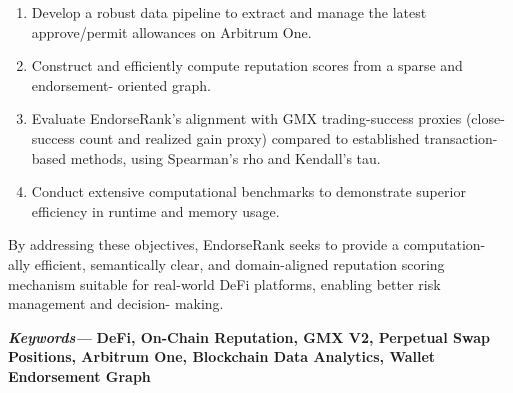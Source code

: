 \begin{enumerate}
\item[1.] Develop a robust data pipeline to extract and manage the latest approve/permit allowances on Arbitrum One.
\item[2.] Construct and efficiently compute reputation scores from a sparse and endorsement- oriented graph.
\item[3.] Evaluate EndorseRank's alignment with GMX trading-success proxies (close-success count and realized gain proxy) compared to established transaction-based methods, using Spearman's rho and Kendall's tau.
\item[4.] Conduct extensive computational benchmarks to demonstrate superior efficiency in runtime and memory usage.
\end{enumerate}
By addressing these objectives, EndorseRank seeks to provide a computation- ally efficient, semantically clear, and domain-aligned reputation scoring mechanism suitable for real-world DeFi platforms, enabling better risk management and decision- making.


\textbf{\emph{Keywords--- }}\textbf{DeFi, On-Chain Reputation, GMX V2, Perpetual Swap Positions, Arbitrum One, Blockchain Data Analytics, Wallet Endorsement Graph}
